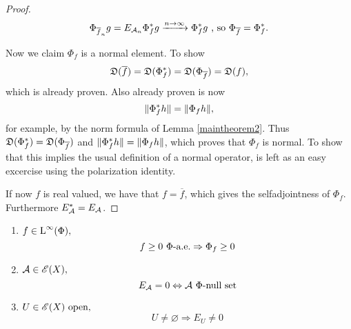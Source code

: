 \begin{proof}
\[
\Phi_{\overline{f}_n} g = E_{\mathcal{A}_n} \Phi_f ^{*} g 
\xrightarrow{n \to \infty} \Phi_f ^{*} g \text{ , so  }
\Phi_{\overline{f}} = \Phi_f ^{*}.
\]


Now we claim $\Phi_f$ is a normal element. To show
\[
\mathfrak{D}(\overline{f}) = \mathfrak{D}(\Phi_f ^{*}) = \mathfrak{D}(\Phi_{\overline{f}}) = \mathfrak{D}(f),
\]
 which is already proven. Also already proven is now
\[
 \| \Phi_f ^{*} h \| = \| \Phi_f h \|,
\]
for example, by the norm formula of Lemma \ref{maintheorem2}.
Thus $\mathfrak{D}(\Phi_f ^{*}) = \mathfrak{D}(\Phi_{\overline{f}})$ and 
$\| \Phi_f ^{*} h \| = \| \Phi_f h \|$, which proves that $\Phi_f$ is normal.
To show that this implies the usual definition of a normal operator,
is left as an easy excercise using the polarization identity.

If now $f$ is real valued, we have that $f = \overline{f}$, which gives 
the selfadjointness of $\Phi_f$. Furthermore $E_\mathcal{A} ^{*} = E_\mathcal{A}$.

\end{proof}

\begin{lem}
  \leavevmode
  \label{maintheorem3+}
 \begin{enumerate}
  \item $f \in {\text{L}^\infty }(\Phi),$ 
  \[
   f \geq 0 ~\Phi\text{-a.e.} \Rightarrow \Phi_f \geq 0
  \]

  \item $\mathcal{A} \in \mathscr{E}(X),$
  \[
  E_\mathcal{A} =0  \Leftrightarrow \mathcal{A} ~\Phi\text{-null set}
  \]
  \item $U \in \mathscr{E}(X)\text{ open,}$ 
  \[
   U \neq \varnothing \Rightarrow E_U \neq 0
  \]

 \end{enumerate}

\end{lem}



